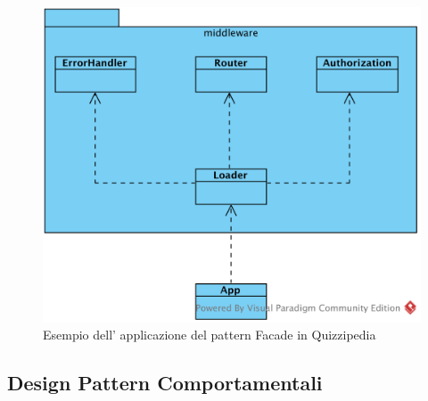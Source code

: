 \documentclass[12pt,a4paper]{article}
\begin{document}
\begin{center}
	\begin{figure}[H]
		\centering \includegraphics[max width=\textwidth]{../img/facadeStarware.png}
		\caption{Esempio dell' applicazione del pattern Facade in Quizzipedia}
	\end{figure}
\end{center}

\subsection{Design Pattern Comportamentali}
\end{document}
